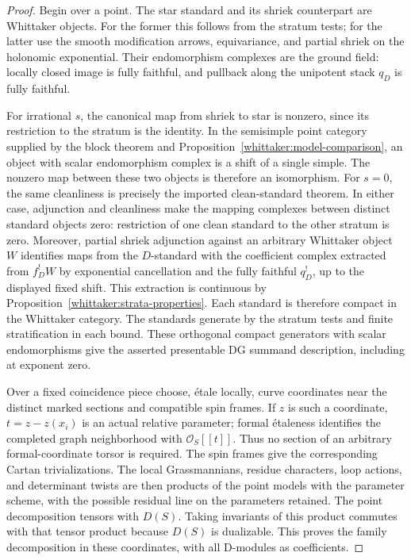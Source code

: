\documentclass[11pt]{article}
\numberwithin{equation}{section}
\theoremstyle{definition}
\theoremstyle{remark}
\begin{document}
\begin{proof}
Begin over a point. The star standard and its shriek counterpart are
Whittaker objects. For the former this follows from the stratum tests;
for the latter use the smooth modification arrows, equivariance, and
partial shriek on the holonomic exponential. Their endomorphism
complexes are the ground field: locally closed image is fully faithful,
and pullback along the unipotent stack $q_D$ is fully faithful.

For irrational $s$, the canonical map from shriek to star is nonzero,
since its restriction to the stratum is the identity. In the semisimple
point category supplied by the block theorem and
Proposition~\ref{whittaker:model-comparison}, an object with scalar
endomorphism complex is a shift of a single simple. The nonzero map
between these two objects is therefore an isomorphism. For $s=0$, the
same cleanliness is precisely the imported clean-standard theorem.
In either case, adjunction and cleanliness make the mapping complexes
between distinct standard objects zero: restriction of one clean
standard to the other stratum is zero. Moreover, partial shriek
adjunction against an arbitrary Whittaker object $W$ identifies maps
from the $D$-standard with the coefficient complex extracted from
$f_D^!W$ by exponential cancellation and the fully faithful $q_D^!$,
up to the displayed fixed shift. This extraction is continuous by
Proposition~\ref{whittaker:strata-properties}. Each standard is therefore
compact in the Whittaker category. The standards generate by the stratum
tests and finite stratification in each bound. These orthogonal compact
generators with scalar endomorphisms give the asserted presentable DG
summand description, including at exponent zero.

Over a fixed coincidence piece choose, \'etale locally, curve coordinates
near the distinct marked sections and compatible spin frames. If $z$ is
such a coordinate, $t=z-z(x_i)$ is an actual relative parameter; formal
\'etaleness identifies the completed graph neighborhood with
$\mathcal O_S[[t]]$. Thus no section of an arbitrary formal-coordinate
torsor is required. The spin frames give the corresponding Cartan
trivializations. The local Grassmannians, residue
characters, loop actions, and determinant twists are then products of
the point models with the parameter scheme, with the possible residual
line on the parameters retained. The point decomposition tensors with
$D(S)$. Taking invariants of this product commutes with that tensor
product because $D(S)$ is dualizable. This proves the family decomposition
in these coordinates, with all D-modules as coefficients.


\end{proof}
\end{document}
